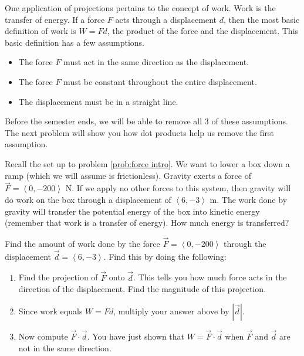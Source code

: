 One application of projections pertains to the concept of work. Work is the transfer of energy. If a force $F$ acts through a displacement $d$, then the most basic definition of work is $W=Fd$, the product of the force and the displacement.  This basic definition has a few assumptions.
\begin{itemize}
\item The force $F$ must act in the same direction as the displacement.
\item The force $F$ must be constant throughout the entire displacement.
\item The displacement must be in a straight line.
\end{itemize}
Before the semester ends, we will be able to remove all 3 of these assumptions.  The next problem will show you how dot products help us remove the first assumption.

Recall the set up to problem \ref{prob:force intro}.  We want to lower a box down a ramp (which we will assume is frictionless). Gravity exerts a force of $\vec F=\left<0,-200\right>$ N. If we apply no other forces to this system, then gravity will do work on the box through a displacement of $\left<6,-3\right>$ m. The work done by gravity will transfer the potential energy of the box into kinetic energy (remember that work is a transfer of energy).  How much energy is transferred?

\begin{problem}\label{first work problem}
% 
Find the amount of work done by the force $\vec F=\left<0,-200\right>$ through the displacement $\vec d=\left<6,-3\right>$. Find this by doing the following:
\begin{enumerate}
\item Find the projection of $\vec F$ onto $\vec d$. This tells you how much force acts in the direction of the displacement. Find the magnitude of this projection.
\item Since work equals $W=Fd$, multiply your answer above by $|\vec {d}|$.  
\item Now compute $\vec F\cdot \vec d$. You have just shown that $W=\vec F\cdot \vec d$ when $\vec F$ and $\vec d$ are not in the same direction.
\end{enumerate}
\end{problem}


